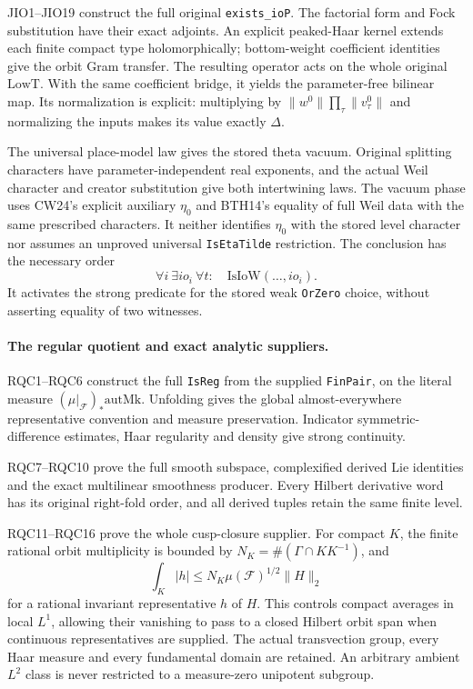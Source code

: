 JIO1--JIO19 construct the full original \texttt{exists\_ioP}.
The factorial form and Fock substitution have their exact adjoints.
An explicit peaked-Haar kernel extends each finite compact type
holomorphically; bottom-weight coefficient identities give the orbit
Gram transfer. The resulting operator acts on the whole original
$\mathrm{LowT}$. With the same coefficient bridge, it yields the
parameter-free bilinear map. Its normalization is explicit:
multiplying by $\|w^0\|\prod_\tau\|v_\tau^0\|$ and normalizing
the inputs makes its value exactly $\Delta$.

The universal place-model law gives the stored theta vacuum.
Original splitting characters have parameter-independent real
exponents, and the actual Weil character and creator substitution
give both intertwining laws. The vacuum phase uses CW24's explicit
auxiliary $\eta_0$ and BTH14's equality of full Weil data with the
same prescribed characters. It neither identifies $\eta_0$ with
the stored level character nor assumes an unproved universal
\texttt{IsEtaTilde} restriction.
The conclusion has the necessary order
\[
       \forall i\ \exists io_i\ \forall t:\quad
                         \mathrm{IsIoW}(\ldots,io_i).
\]
It activates the strong predicate for the stored weak
\texttt{OrZero} choice, without asserting equality of two witnesses.

\paragraph{The regular quotient and exact analytic suppliers.}
RQC1--RQC6 construct the full \texttt{IsReg} from the supplied
\texttt{FinPair}, on the literal measure
$(\mu|_{\mathcal F})_*\mathrm{autMk}$.
Unfolding gives the global almost-everywhere representative convention
and measure preservation. Indicator symmetric-difference estimates,
Haar regularity and density give strong continuity.

RQC7--RQC10 prove the full smooth subspace, complexified derived
Lie identities and the exact multilinear smoothness producer.
Every Hilbert derivative word has its original right-fold order,
and all derived tuples retain the same finite level.

RQC11--RQC16 prove the whole cusp-closure supplier.
For compact $K$, the finite rational orbit multiplicity is bounded
by $N_K=\#(\Gamma\cap KK^{-1})$, and
\[
 \int_K|h|\le N_K\mu(\mathcal F)^{1/2}\|H\|_2
\]
for a rational invariant representative $h$ of $H$.
This controls compact averages in local $L^1$, allowing their
vanishing to pass to a closed Hilbert orbit span when continuous
representatives are supplied. The actual transvection group,
every Haar measure and every fundamental domain are retained.
An arbitrary ambient $L^2$ class is never restricted to a
measure-zero unipotent subgroup.

